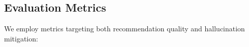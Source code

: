 \documentclass[acmsmall]{acmart}
\begin{document}






\subsection{Evaluation Metrics}
We employ metrics targeting both recommendation quality and hallucination mitigation:
\end{document}
